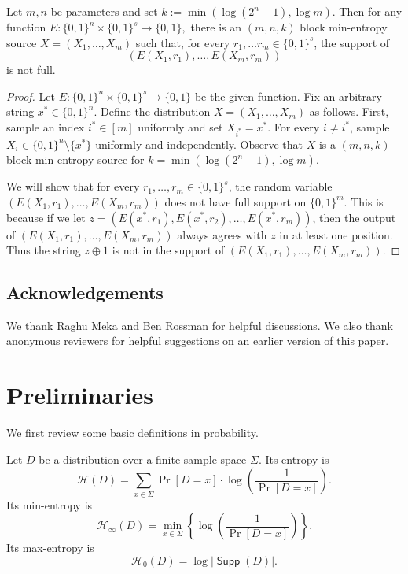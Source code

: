 \documentclass{toc}
\def\entropy{\mathcal{H}}
\DeclareMathOperator{\Supp}{\mathsf{Supp}}  %
\begin{document}
\begin{theorem}
\label{thm: barrier}
Let $m,n$ be parameters %
%
and set $k:= \min(\log (2^n - 1), \log m).$
%
Then for any function
$E:\{0,1\}^{n}\times\{0,1\}^{s}\rightarrow\{0,1\},$ there is
an $(m,n,k)$ block min-entropy source $X=(X_1,\dots,X_m)$ such that,
for every $r_1,\dots r_{m}\in\{0,1\}^{s}$, the support of
\[
(E(X_{1},r_1),\dots,E(X_{m}, r_{m}))
\]
is not full.
\end{theorem}

\begin{proof}
Let $E:\{0,1\}^n \times \{0,1\}^s \rightarrow \{0,1\}$ be the given function. Fix an arbitrary string $x^{*} \in \{0,1\}^n$. Define the distribution $X=(X_1,\ldots,X_m)$ as follows. First, sample an index $i^{*}\in [m]$ uniformly and set $X_{i^{*}} = x^{*}$.
For every $i\neq i^{*}$, sample $X_{i}\in\{0,1\}^{n}\setminus\{x^{*}\}$ uniformly and independently.
Observe that $X$ is a $(m,n,k)$ block min-entropy source for 
%
$k = \min(\log (2^n-1), \log m). $   %

We will show that for every $r_1,\ldots,r_m \in \{0,1\}^s$, the random variable $(E(X_1,r_1),\ldots,E(X_m,r_m))$ does not have full support on $\{0,1\}^m$. This is because if we let $z = (E(x^{*},r_1), E(x^{*},r_2),\ldots,E(x^{*},r_m))$, then the output of $(E(X_1,r_1),\ldots,E(X_m,r_m))$ always agrees with $z$ in at least one position. Thus the string $z\oplus 1$ is not in the support of $(E(X_1,r_1),\ldots,E(X_m,r_m))$.


\end{proof}

%
%
%
%

\subsection*{Acknowledgements}
We thank Raghu Meka and Ben Rossman for helpful discussions. We also thank anonymous reviewers for helpful suggestions on an earlier version of this paper.

\section{Preliminaries}
\label{sec:pre}

%
%
%
We first review some basic definitions in probability.
\begin{definition}
Let $D$ be a distribution over a finite  
sample space %
$\Sigma$.   %
Its entropy is  %
\[
\entropy(D) = \sum_{x\in\Sigma}\Pr[D=x]\cdot\log \left(\frac{1}{\Pr[D=x]}\right).
\]
Its min-entropy  is
\[
\entropy_{\infty}(D) = \min_{x\in\Sigma}\left\{\log \left(\frac{1}{\Pr[D=x]}\right)\right\}.
\]
Its max-entropy is
\[
%
\entropy_{0}(D) =\log |\Supp(D)|. %
\]
\end{definition}
\end{document}
